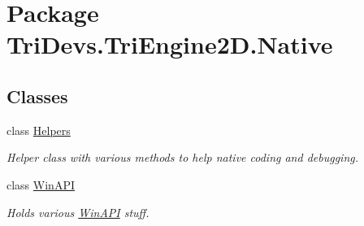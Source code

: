 \hypertarget{namespace_tri_devs_1_1_tri_engine2_d_1_1_native}{\section{Package Tri\-Devs.\-Tri\-Engine2\-D.\-Native}
\label{namespace_tri_devs_1_1_tri_engine2_d_1_1_native}
}
\subsection*{Classes}
\begin{DoxyCompactItemize}
\item 
class \hyperlink{class_tri_devs_1_1_tri_engine2_d_1_1_native_1_1_helpers}{Helpers}
\begin{DoxyCompactList}\small\item\em Helper class with various methods to help native coding and debugging. \end{DoxyCompactList}\item 
class \hyperlink{class_tri_devs_1_1_tri_engine2_d_1_1_native_1_1_win_a_p_i}{Win\-A\-P\-I}
\begin{DoxyCompactList}\small\item\em Holds various \hyperlink{class_tri_devs_1_1_tri_engine2_d_1_1_native_1_1_win_a_p_i}{Win\-A\-P\-I} stuff. \end{DoxyCompactList}\end{DoxyCompactItemize}
